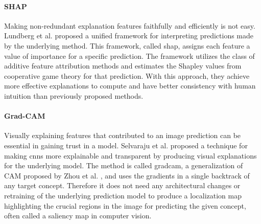 \paragraph{SHAP\\}
Making non-redundant explanation features faithfully and efficiently is not easy. Lundberg et al. \cite{lundbergUnifiedApproachInterpreting2017} proposed a unified framework for interpreting predictions made by the underlying method. This framework, called \gls{shap}, assigns each feature a value of importance for a specific prediction. The framework utilizes the class of additive feature attribution methods and estimates the Shapley values \cite{shapleyValueNpersonGames1988} from cooperative game theory for that prediction. With this approach, they achieve more effective explanations to compute and have better consistency with human intuition than previously proposed methods.  


\paragraph{Grad-CAM\\}
Visually explaining features that contributed to an image prediction can be essential in gaining trust in a model. Selvaraju et al. \cite{selvarajuGradCAMVisualExplanations2020} proposed a technique for making \glspl{cnn} more explainable and transparent by producing visual explanations for the underlying model. The method is called \gls{gradcam}, a generalization of CAM proposed by Zhou et al. \cite{zhouLearningDeepFeatures2016}, and uses the gradients in a single backtrack of any target concept. Therefore it does not need any architectural changes or retraining of the underlying prediction model to produce a localization map highlighting the crucial regions in the image for predicting the given concept, often called a saliency map in computer vision.



